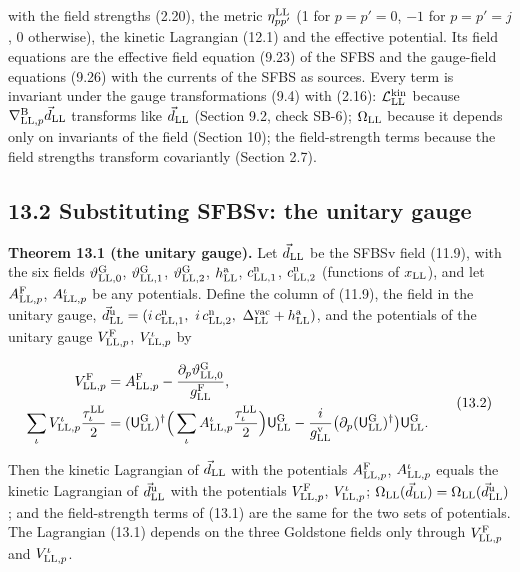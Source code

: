 \documentclass[
  10pt,
]{article}
\begin{document}
with the field strengths (2.20), the metric \(\eta^{\rm LL}_{pp'}\) (1
for \(p=p'=0\), \(-1\) for \(p=p'=j\), 0 otherwise), the kinetic
Lagrangian (12.1) and the effective potential. Its field equations are
the effective field equation (9.23) of the SFBS and the gauge-field
equations (9.26) with the currents of the SFBS as sources. Every term is
invariant under the gauge transformations (9.4) with (2.16):
\(\mathcal L^{\rm kin}_{\rm LL}\) because
\(\nabla^{\rm B}_{{\rm LL},p}\vec d_{\rm LL}\) transforms like
\(\vec d_{\rm LL}\) (Section 9.2, check SB-6); \(\Omega_{\rm LL}\)
because it depends only on invariants of the field (Section 10); the
field-strength terms because the field strengths transform covariantly
(Section 2.7).

\hypertarget{substituting-sfbsv-the-unitary-gauge}{%
\subsection{13.2 Substituting SFBSv: the unitary
gauge}\label{substituting-sfbsv-the-unitary-gauge}}

\textbf{Theorem 13.1 (the unitary gauge).} Let \(\vec d_{\rm LL}\) be
the SFBSv field (11.9), with the six fields
\(\vartheta^{\rm G}_{{\rm LL},0}\), \(\vartheta^{\rm G}_{{\rm LL},1}\),
\(\vartheta^{\rm G}_{{\rm LL},2}\), \(h^{\rm a}_{\rm LL}\),
\(c^{\rm n}_{{\rm LL},1}\), \(c^{\rm n}_{{\rm LL},2}\) (functions of
\(x_{\rm LL}\)), and let \(A^{\rm F}_{{\rm LL},p}\),
\(A^\iota_{{\rm LL},p}\) be any potentials. Define the column of (11.9),
the field in the unitary gauge,
\(\vec d^{\rm u}_{\rm LL}=(i\,c^{\rm n}_{{\rm LL},1},\ i\,c^{\rm n}_{{\rm LL},2},\ \Delta^{\rm vac}_{\rm LL}+h^{\rm a}_{\rm LL})\),
and the potentials of the unitary gauge \(V^{\rm F}_{{\rm LL},p}\),
\(V^\iota_{{\rm LL},p}\) by

\[\begin{aligned}V^{\rm F}_{{\rm LL},p}&=A^{\rm F}_{{\rm LL},p}-\frac{\partial_p\vartheta^{\rm G}_{{\rm LL},0}}{g^{\rm F}_{\rm LL}},\\\sum_\iota V^\iota_{{\rm LL},p}\frac{\tau^{\rm LL}_\iota}2&=(\mathsf U^{\rm G}_{\rm LL})^\dagger\Big(\sum_\iota A^\iota_{{\rm LL},p}\frac{\tau^{\rm LL}_\iota}2\Big)\mathsf U^{\rm G}_{\rm LL}-\frac i{g^{\rm v}_{\rm LL}}\big(\partial_p(\mathsf U^{\rm G}_{\rm LL})^\dagger\big)\mathsf U^{\rm G}_{\rm LL}.\end{aligned}\tag{13.2}\]

Then the kinetic Lagrangian of \(\vec d_{\rm LL}\) with the potentials
\(A^{\rm F}_{{\rm LL},p}\), \(A^\iota_{{\rm LL},p}\) equals the kinetic
Lagrangian of \(\vec d^{\rm u}_{\rm LL}\) with the potentials
\(V^{\rm F}_{{\rm LL},p}\), \(V^\iota_{{\rm LL},p}\);
\(\Omega_{\rm LL}(\vec d_{\rm LL})=\Omega_{\rm LL}(\vec d^{\rm u}_{\rm LL})\);
and the field-strength terms of (13.1) are the same for the two sets of
potentials. The Lagrangian (13.1) depends on the three Goldstone fields
only through \(V^{\rm F}_{{\rm LL},p}\) and \(V^\iota_{{\rm LL},p}\).
\end{document}
